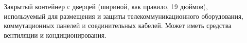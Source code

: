 Закрытый контейнер с дверцей (шириной, как правило, 19
дюймов), используемый для размещения и защиты телекоммуникационного
оборудования, коммутационных панелей и соединительных
кабелей. Может иметь средства вентиляции и кондиционирования.